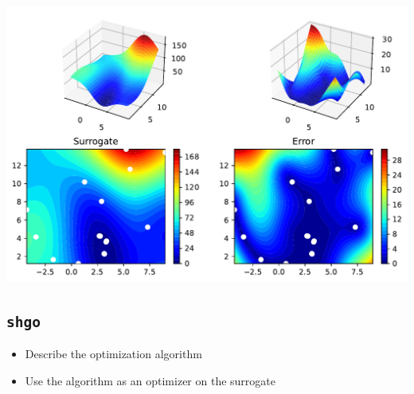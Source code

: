 \documentclass[
  letterpaper,
  DIV=11,
  numbers=noendperiod]{scrreprt}
\providecommand{\tightlist}{%
  \setlength{\itemsep}{0pt}\setlength{\parskip}{0pt}}\usepackage{longtable,booktabs,array}
\begin{document}
\begin{tcolorbox}
\includegraphics{004_spot_sklearn_optimization_files/figure-pdf/cell-10-output-3.pdf}

\end{tcolorbox}

\subsection{\texorpdfstring{\texttt{shgo}}{shgo}}\label{shgo-1}

\begin{itemize}
\tightlist
\item
  Describe the optimization algorithm
\item
  Use the algorithm as an optimizer on the surrogate
\end{itemize}
\end{document}
